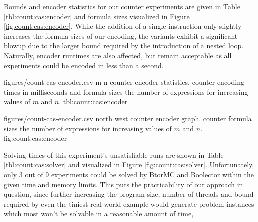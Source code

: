 \newpage

Bounds and encoder statistics for our  counter experiments are given in Table \ref{tbl:count:cas:encoder} and formula sizes visualized in Figure \ref{fig:count:cas:encoder}.
While the addition of a single instruction only slightly increases the formula sizes of our {\BTOR} encoding, the {\SMTLIB} variants exhibit a significant blowup due to the larger bound required by the introduction of a nested loop.
Naturally, encoder runtimes are also affected, but remain acceptable as all experiments could be encoded in less than a second.

\bigbreak

\EncoderStatsTable
  {figures/count-cas-encoder.csv}
  {m n}
  {\CountRowHeader}
  { counter encoder statistics.}
  { counter encoding times in milliseconds and formula sizes  the number of expressions for increasing values of $m$ and $n$.}
  {tbl:count:cas:encoder}

\EncoderStatsGraph
  {figures/count-cas-encoder.csv}
  {north west}
  { counter encoder graph.}
  { counter formula sizes  the number of expressions for increasing values of $m$ and $n$.}
  {fig:count:cas:encoder}

\newpage

Solving times of this experiment's unsatisfiable runs are shown in Table \ref{tbl:count:cas:solver} and visualized in Figure \ref{fig:count:cas:solver}.
Unfortunately, only 3 out of 9 experiments could be solved by BtorMC and Boolector within the given time and memory limits.
This puts the practicability of our approach in question, since further increasing the program size, number of threads and bound required by even the tiniest real world example
would generate problem instances which most  won't be solvable in a reasonable amount of time,

